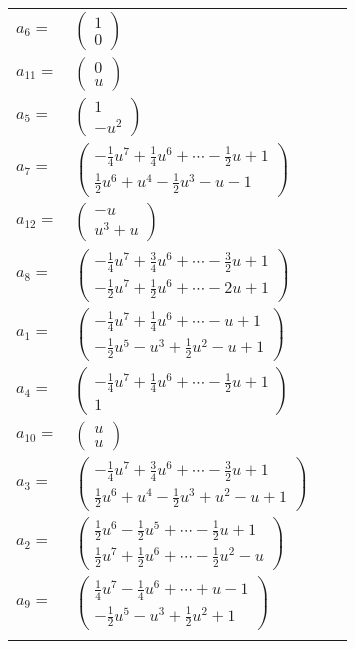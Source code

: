 \documentclass[1p]{elsarticle_modified}
\theoremstyle{definition}
\begin{document}
\begin{tabular}{m{7pt} m{180pt} m{7pt} m{180pt} }
\flushright $a_{6}=$&$\begin{pmatrix}1\\0\end{pmatrix}$ \\
\flushright $a_{11}=$&$\begin{pmatrix}0\\u\end{pmatrix}$ \\
\flushright $a_{5}=$&$\begin{pmatrix}1\\- u^2\end{pmatrix}$ \\
\flushright $a_{7}=$&$\begin{pmatrix}-\frac{1}{4} u^7+\frac{1}{4} u^6+\cdots-\frac{1}{2} u+1\\\frac{1}{2} u^6+u^4-\frac{1}{2} u^3- u-1\end{pmatrix}$ \\
\flushright $a_{12}=$&$\begin{pmatrix}- u\\u^3+u\end{pmatrix}$ \\
\flushright $a_{8}=$&$\begin{pmatrix}-\frac{1}{4} u^7+\frac{3}{4} u^6+\cdots-\frac{3}{2} u+1\\-\frac{1}{2} u^7+\frac{1}{2} u^6+\cdots-2 u+1\end{pmatrix}$ \\
\flushright $a_{1}=$&$\begin{pmatrix}-\frac{1}{4} u^7+\frac{1}{4} u^6+\cdots- u+1\\-\frac{1}{2} u^5- u^3+\frac{1}{2} u^2- u+1\end{pmatrix}$ \\
\flushright $a_{4}=$&$\begin{pmatrix}-\frac{1}{4} u^7+\frac{1}{4} u^6+\cdots-\frac{1}{2} u+1\\1\end{pmatrix}$ \\
\flushright $a_{10}=$&$\begin{pmatrix}u\\u\end{pmatrix}$ \\
\flushright $a_{3}=$&$\begin{pmatrix}-\frac{1}{4} u^7+\frac{3}{4} u^6+\cdots-\frac{3}{2} u+1\\\frac{1}{2} u^6+u^4-\frac{1}{2} u^3+u^2- u+1\end{pmatrix}$ \\
\flushright $a_{2}=$&$\begin{pmatrix}\frac{1}{2} u^6-\frac{1}{2} u^5+\cdots-\frac{1}{2} u+1\\\frac{1}{2} u^7+\frac{1}{2} u^6+\cdots-\frac{1}{2} u^2- u\end{pmatrix}$ \\
\flushright $a_{9}=$&$\begin{pmatrix}\frac{1}{4} u^7-\frac{1}{4} u^6+\cdots+u-1\\-\frac{1}{2} u^5- u^3+\frac{1}{2} u^2+1\end{pmatrix}$\\&\end{tabular}
\end{document}
